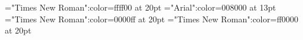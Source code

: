 \documentclass{article}
\begin{document}
 
\thispagestyle{empty} 
\font\tdta="Times New Roman":color=ffff00 at 20pt
\font\tctbta="Arial":color=008000 at 13pt
\font\tbta="Times New Roman":color=0000ff at 20pt
\font\ta="Times New Roman":color=ff0000 at 20pt






\end{document}
